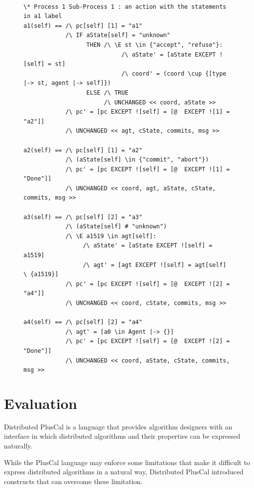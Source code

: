 \documentclass{thesul}
\newcommand{\tlaplus}{TLA\textsuperscript{+}\xspace}
\begin{document}
\begin{enumerate}
\FloatBarrier
\begin{figure}
\label{2pcSubProcPc}
\begin{lstlisting}[caption = \tlaplus translation for Sub-Processes, frame = tlrb, firstnumber = 1]

\* Process 1 Sub-Process 1 : an action with the statements in a1 label
a1(self) == /\ pc[self] [1] = "a1"
            /\ IF aState[self] = "unknown"
                  THEN /\ \E st \in {"accept", "refuse"}:
                            /\ aState' = [aState EXCEPT ![self] = st]
                            /\ coord' = (coord \cup {[type |-> st, agent |-> self]})
                  ELSE /\ TRUE
                       /\ UNCHANGED << coord, aState >>
            /\ pc' = [pc EXCEPT ![self] = [@  EXCEPT ![1] = "a2"]]
            /\ UNCHANGED << agt, cState, commits, msg >>

a2(self) == /\ pc[self] [1] = "a2"
            /\ (aState[self] \in {"commit", "abort"})
            /\ pc' = [pc EXCEPT ![self] = [@  EXCEPT ![1] = "Done"]]
            /\ UNCHANGED << coord, agt, aState, cState, commits, msg >>

a3(self) == /\ pc[self] [2] = "a3"
            /\ (aState[self] # "unknown")
            /\ \E a1519 \in agt[self]:
                 /\ aState' = [aState EXCEPT ![self] = a1519]
                 /\ agt' = [agt EXCEPT ![self] = agt[self] \ {a1519}]
            /\ pc' = [pc EXCEPT ![self] = [@  EXCEPT ![2] = "a4"]]
            /\ UNCHANGED << coord, cState, commits, msg >>

a4(self) == /\ pc[self] [2] = "a4"
            /\ agt' = [a0 \in Agent |-> {}]
            /\ pc' = [pc EXCEPT ![self] = [@  EXCEPT ![2] = "Done"]]
            /\ UNCHANGED << coord, aState, cState, commits, msg >>
\end{lstlisting}
\end{figure}
\FloatBarrier

\end{enumerate}


\section{Evaluation}

Distributed PlusCal is a language that provides algorithm designers with an interface in which distributed algorithms and their properties can be expressed naturally.

While the PlusCal language may enforce some limitations that make it difficult to express distributed algorithms in a natural way, Distributed PlusCal introduced constructs that can overcome these limitation.
\end{document}
